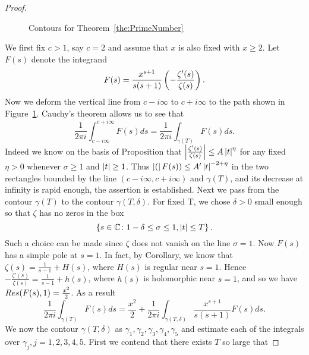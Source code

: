 \begin{proof}
\begin{figure}[!htb]
\caption{Contours for Theorem~\ref{the:PrimeNumber}}
\label{fig:ContourGamma}
\end{figure}
	We first fix $c > 1$, say $c = 2$ and assume that $x$ is also fixed with $x \geq 2$. Let $F(s)$ denote the integrand
\begin{equation*}
	F(s) = \frac{x^{s + 1}}{s(s + 1)} \left(-\frac{\zeta'(s)}{\zeta(s)}\right).
\end{equation*}
	Now we deform the vertical line from $c - i \infty$ to $c + i \infty$ to the path shown in Figure~\ref{fig:ContourGamma}. Cauchy's theorem allows us to see that
\begin{equation*}
	\frac{1}{2 \pi i} \int _{c - i \infty} ^{c + i \infty} F(s) ds = \frac{1}{2 \pi i} \int _{\gamma(T)} F(s) ds.
\end{equation*}
	Indeed we know on the basis of Proposition that $\left|\frac{\zeta'(s)}{\zeta(s)}\right| \leq A\left|t\right|^\eta$ for any fixed $\eta > 0$ whenever $\sigma \geq 1$ and $\left|t\right| \geq 1$. Thus $\left|(\right|F(s)) \leq A'\left|t\right|^{-2 + \eta}$ in the two rectangles bounded by the line $(c - i \infty, c + i\infty)$ and $\gamma(T)$, and its decrease at infinity is rapid enough, the assertion is established.
	Next we pass from the contour $\gamma(T)$ to the contour $\gamma(T, \delta)$. For fixed T, we chose $\delta > 0$ small enough so that $\zeta$ has no zeros in the box
\begin{equation*}
	\left\{s \in \mathbb{C} \colon 1 - \delta \leq \sigma \leq 1, \left|t\right| \leq T\right\}.
\end{equation*}
	Such a choice can be made since $\zeta$ does not vanish on the line $\sigma = 1$. Now $F(s)$ has a simple pole at $s = 1$. In fact, by Corollary, we know that $\zeta(s) = \frac{1}{s - 1} + H(s)$, where $H(s)$ is regular near $s = 1$. Hence $-\frac{\zeta'(s)}{\zeta(s)} =\frac{1}{s - 1} + h(s)$, where $h(s)$ is holomorphic near $s = 1$, and so we have $\mathop{Res}(F(s), 1) = \frac{x^2}{2}$. As a result
\begin{equation*}
	\frac{1}{2 \pi i} \int _{\gamma(T)} F(s) ds = \frac{x^2}{2} + \frac{1}{2 \pi i} \int _{\gamma(T, \delta)} \frac{x^{s + 1}}{s(s + 1)} F(s) ds.
\end{equation*}
	We now the contour $\gamma(T, \delta)$ as $\gamma_1, \gamma_2, \gamma_3, \gamma_4, \gamma_5$ and estimate each of the integrals over $\gamma_j, j=1,2,3,4,5$. First we contend that there exists $T$ so large that

\end{proof}

